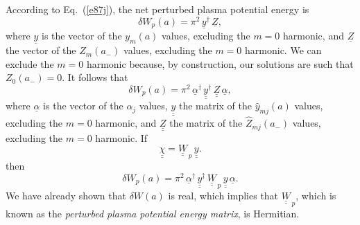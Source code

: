 \documentclass[12pt,prb,aps]{revtex4-1}
\begin{document}
According to Eq.~(\ref{e87j}), the net perturbed plasma potential energy is
\begin{equation}
\delta W_p(a) = \pi^2\,\underline{y}^{\dag}\,\underline{Z},
\end{equation}
where $\underline{y}$ is the vector of the $y_m(a)$ values, excluding the $m=0$ harmonic,  and $\underline{Z}$  the vector of the $Z_m(a_-)$ values,
excluding the $m=0$ harmonic.  We can exclude the $m=0$ harmonic because, by construction, our solutions are such that $Z_0(a_-)=0$. It follows that
\begin{equation}
\delta W_p(a) = \pi^2\,\underline{\alpha}^\dag \,\underline{\underline{y}}^\dag \,\underline{\underline{Z}}\,\underline{\alpha},
\end{equation}
where $\underline{\alpha}$ is the vector of the $\alpha_j$ values, $\underline{\underline{y}}$ the matrix of the $\hat{y}_{mj}(a)$ values, excluding the $m=0$ harmonic, 
and $\underline{\underline{Z}}$ the matrix of the $\hat{Z}_{mj}(a_-)$ values, excluding the $m=0$ harmonic. 
If
\begin{equation}
\underline{\underline{\chi}} = \underline{\underline{W}}_{\,p}\,\underline{\underline{y}}.
\end{equation}
then 
\begin{equation}
\delta W_p(a) = \pi^2\,\underline{\alpha}^\dag \,\underline{\underline{y}}^\dag \,\underline{\underline{W}}_{\,p}\,\underline{\underline{y}}\,\underline{\alpha}.
\end{equation}
We have already shown that $\delta W(a)$ is real, which implies that $\underline{\underline{W}}_{\,p}$, which is known as the {\em perturbed plasma potential energy matrix},
is Hermitian. 
\end{document}
